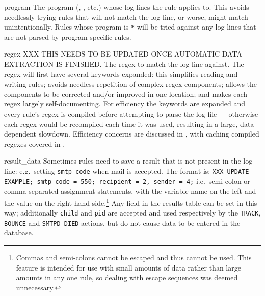 \begin{eqlist}
    \item [program] The program (, , etc.) whose
        log lines the rule applies to.  This avoids needlessly trying rules
        that will not match the log line, or worse, might match
        unintentionally.  Rules whose program is \texttt{*} will be tried
        against any log lines that are not parsed by program specific
        rules.

    \item [regex] XXX THIS NEEDS TO BE UPDATED ONCE AUTOMATIC DATA
        EXTRACTION IS FINISHED\@.  The regex to match the log line
        against.  The regex will first have several keywords expanded:
        this simplifies reading and writing rules; avoids needless
        repetition of complex regex components; allows the components to
        be corrected and/or improved in one location; and makes each
        regex largely self-documenting.  For efficiency the keywords are
        expanded and every rule's regex is compiled before attempting to
        parse the log file --- otherwise each regex would be recompiled
        each time it was used, resulting in a large, data dependent
        slowdown.  Efficiency concerns are discussed in , with caching compiled regexes covered in
        .

    \item [result\_data] Sometimes rules need to save a result that is not
        present in the log line: e.g.\ setting \texttt{smtp\_code} when
        mail is accepted.  The format is: \newline{} \tab{} \texttt{XXX
        UPDATE EXAMPLE\@; smtp\_code = 550; \newline{} recipient = 2,
        sender = 4;} \newline{} i.e.\ semi-colon or comma separated
        assignment statements, with the variable name on the left and the
        value on the right hand side.\footnote{Commas and semi-colons
        cannot be escaped and thus cannot be used.  This feature is
        intended for use with small amounts of data rather than large
        amounts in any one rule, so dealing with escape sequences was
        deemed unnecessary.}  Any field in the results table can be set in
        this way; additionally \texttt{child} and \texttt{pid} are accepted
        and used respectively by the \texttt{TRACK}, \texttt{BOUNCE} and
        \texttt{SMTPD\_DIED} actions, but do not cause data to be entered
        in the database.


\end{eqlist}
